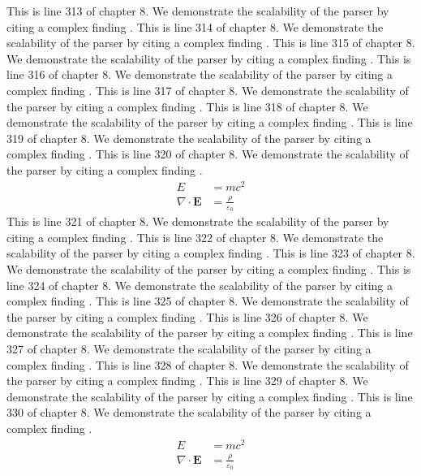 This is line 313 of chapter 8. We demonstrate the scalability of the parser by citing a complex finding \cite{ref8_313}.
This is line 314 of chapter 8. We demonstrate the scalability of the parser by citing a complex finding \cite{ref8_314}.
This is line 315 of chapter 8. We demonstrate the scalability of the parser by citing a complex finding \cite{ref8_315}.
This is line 316 of chapter 8. We demonstrate the scalability of the parser by citing a complex finding \cite{ref8_316}.
This is line 317 of chapter 8. We demonstrate the scalability of the parser by citing a complex finding \cite{ref8_317}.
This is line 318 of chapter 8. We demonstrate the scalability of the parser by citing a complex finding \cite{ref8_318}.
This is line 319 of chapter 8. We demonstrate the scalability of the parser by citing a complex finding \cite{ref8_319}.
This is line 320 of chapter 8. We demonstrate the scalability of the parser by citing a complex finding \cite{ref8_320}.
\begin{align*}
  E &= mc^2 \\
  \nabla \cdot \mathbf{E} &= \frac{\rho}{\varepsilon_0}
\end{align*}
This is line 321 of chapter 8. We demonstrate the scalability of the parser by citing a complex finding \cite{ref8_321}.
This is line 322 of chapter 8. We demonstrate the scalability of the parser by citing a complex finding \cite{ref8_322}.
This is line 323 of chapter 8. We demonstrate the scalability of the parser by citing a complex finding \cite{ref8_323}.
This is line 324 of chapter 8. We demonstrate the scalability of the parser by citing a complex finding \cite{ref8_324}.
This is line 325 of chapter 8. We demonstrate the scalability of the parser by citing a complex finding \cite{ref8_325}.
This is line 326 of chapter 8. We demonstrate the scalability of the parser by citing a complex finding \cite{ref8_326}.
This is line 327 of chapter 8. We demonstrate the scalability of the parser by citing a complex finding \cite{ref8_327}.
This is line 328 of chapter 8. We demonstrate the scalability of the parser by citing a complex finding \cite{ref8_328}.
This is line 329 of chapter 8. We demonstrate the scalability of the parser by citing a complex finding \cite{ref8_329}.
This is line 330 of chapter 8. We demonstrate the scalability of the parser by citing a complex finding \cite{ref8_330}.
\begin{align*}
  E &= mc^2 \\
  \nabla \cdot \mathbf{E} &= \frac{\rho}{\varepsilon_0}
\end{align*}
